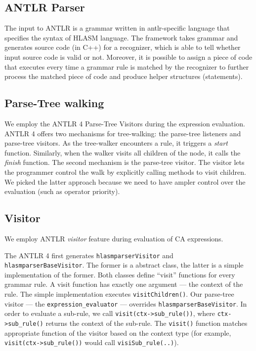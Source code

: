 \subsection{ANTLR Parser}

The input to ANTLR is a grammar written in antlr-specific language that specifies the syntax of HLASM language. The framework takes grammar and generates source code (in C++) for a recognizer, which is able to tell whether input source code is valid or not. Moreover, it is possible to assign a piece of code that executes every time a grammar rule is matched by the recognizer to further process the matched piece of code and produce helper structures (statements).

\subsection{Parse-Tree walking}

We employ the ANTLR 4 Parse-Tree Visitors during the expression evaluation. ANTLR 4 offers two mechanisms for tree-walking: the parse-tree listeners and parse-tree visitors. As the tree-walker encounters a rule, it triggers a \emph{start} function. Similarly, when the walker visits all children of the node, it calls the \emph{finish} function.  The second mechanism is the parse-tree visitor. The visitor lets the programmer control the walk by explicitly calling methods to visit children. We picked the latter approach because we need to have ampler control over the evaluation (such as operator priority).

\subsection{Visitor}

We employ ANTLR \emph{visitor} feature during evaluation of CA expressions. 

The ANTLR 4 first generates \texttt{hlasmparserVisitor} and \texttt{hlasmparserBaseVisitor}. The former is a abstract class, the latter is a simple implementation of the former. Both classes define ``visit'' functions for every grammar rule. A visit function has exactly one argument --- the context of the rule. The simple implementation executes \texttt{visitChildren()}. Our parse-tree visitor --- the \texttt{expression\_evaluator} --- overrides \texttt{hlasmparserBaseVisitor}. In order to evaluate a sub-rule, we call \texttt{visit(ctx->sub\_rule())}, where \texttt{ctx->sub\_rule()} returns the context of the sub-rule. The \texttt{visit()} function matches appropriate function of the visitor based on the context type (for example, \texttt{visit(ctx->sub\_rule())} would call \texttt{visiSub\_rule(..)}).

